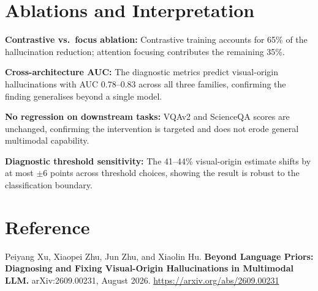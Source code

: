 \documentclass[10pt,twocolumn]{article}
\begin{document}
\section{Ablations and Interpretation}

\textbf{Contrastive vs.\ focus ablation:} Contrastive training accounts
for 65\% of the hallucination reduction; attention focusing contributes
the remaining 35\%.

\textbf{Cross-architecture AUC:} The diagnostic metrics predict
visual-origin hallucinations with AUC 0.78--0.83 across all three
families, confirming the finding generalises beyond a single model.

\textbf{No regression on downstream tasks:} VQAv2 and ScienceQA scores
are unchanged, confirming the intervention is targeted and does not
erode general multimodal capability.

\textbf{Diagnostic threshold sensitivity:} The 41--44\% visual-origin
estimate shifts by at most $\pm$6 points across threshold choices,
showing the result is robust to the classification boundary.

\section*{Reference}

Peiyang Xu, Xiaopei Zhu, Jun Zhu, and Xiaolin Hu.
\textbf{Beyond Language Priors: Diagnosing and Fixing Visual-Origin
Hallucinations in Multimodal LLM.}
arXiv:2609.00231, August 2026.
\url{https://arxiv.org/abs/2609.00231}
\end{document}
